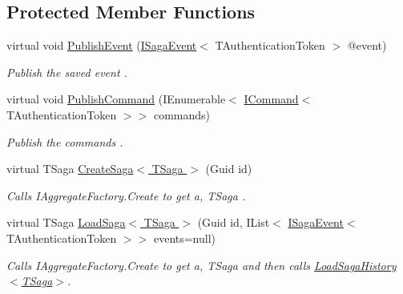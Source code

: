 \subsection*{Protected Member Functions}
\begin{DoxyCompactItemize}
\item 
virtual void \hyperlink{classCqrs_1_1Domain_1_1SagaRepository_a1dec03959e4d859c6cf2be0507b1bc05_a1dec03959e4d859c6cf2be0507b1bc05}{Publish\+Event} (\hyperlink{interfaceCqrs_1_1Events_1_1ISagaEvent}{I\+Saga\+Event}$<$ T\+Authentication\+Token $>$ @event)
\begin{DoxyCompactList}\small\item\em Publish the saved {\itshape event} . \end{DoxyCompactList}\item 
virtual void \hyperlink{classCqrs_1_1Domain_1_1SagaRepository_acf126ad11c6a5996012885d14f9c45c2_acf126ad11c6a5996012885d14f9c45c2}{Publish\+Command} (I\+Enumerable$<$ \hyperlink{interfaceCqrs_1_1Commands_1_1ICommand}{I\+Command}$<$ T\+Authentication\+Token $>$$>$ commands)
\begin{DoxyCompactList}\small\item\em Publish the {\itshape commands} . \end{DoxyCompactList}\item 
virtual T\+Saga \hyperlink{classCqrs_1_1Domain_1_1SagaRepository_acb23e0bd3e5655547a13b4ad2b06e548_acb23e0bd3e5655547a13b4ad2b06e548}{Create\+Saga$<$ T\+Saga $>$} (Guid id)
\begin{DoxyCompactList}\small\item\em Calls I\+Aggregate\+Factory.\+Create to get a, {\itshape T\+Saga} . \end{DoxyCompactList}\item 
virtual T\+Saga \hyperlink{classCqrs_1_1Domain_1_1SagaRepository_acc59a4478bb992b03690f0cda3e4e362_acc59a4478bb992b03690f0cda3e4e362}{Load\+Saga$<$ T\+Saga $>$} (Guid id, I\+List$<$ \hyperlink{interfaceCqrs_1_1Events_1_1ISagaEvent}{I\+Saga\+Event}$<$ T\+Authentication\+Token $>$$>$ events=null)
\begin{DoxyCompactList}\small\item\em Calls I\+Aggregate\+Factory.\+Create to get a, {\itshape T\+Saga}  and then calls \hyperlink{classCqrs_1_1Domain_1_1SagaRepository_af6af9066681e47bc4ff2e14358321fb8_af6af9066681e47bc4ff2e14358321fb8}{Load\+Saga\+History$<$\+T\+Saga$>$}. \end{DoxyCompactList}\end{DoxyCompactItemize}
